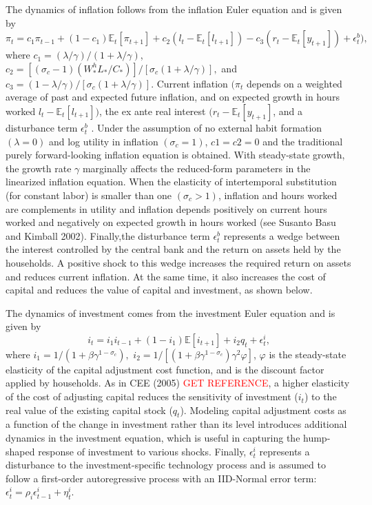 \documentclass[11pt]{article}
\newcommand{\E}{\mathbb{E}}
\newcommand{\cobs}[1]{\pi_{#1}}
\newcommand{\iobs}[1]{i_{#1}}
\newcommand{\lobs}[1]{l_{#1}}
\newcommand{\robs}[1]{r_{#1}}
\newcommand{\piobs}[1]{y_{#1}}
\newcommand{\consumption}{inflation}
\newcommand{\investment}{investment}
\newcommand{\hours}{hours worked}
\newcommand{\realinterest}{real interest}
\newcommand{\labor}{labor}
\newcommand{\interest}{interest}
\newcommand{\attn}[1]{\textcolor{red}{#1}}
\begin{document}
The dynamics of \consumption{} follows from the \consumption{} Euler
equation and is given by \begin{equation}
  \cobs{t} = c_1\cobs{t-1} + (1-c_1)\E_t[\cobs{t+1}] + c_2 (\lobs{t}
  -\E_t[\lobs{t+1}]) - c_3(\robs{t}-\E_t[\piobs{t+1}])+\epsilon_t^b),
\end{equation} where \(c_1 = (\lambda/\gamma)/(1+\lambda/\gamma)\),
\(c_2 = [(\sigma_c - 1)(W_*^h L_*/C_*)] / [\sigma_c(1+\lambda/\gamma)],\)
and \(c_3 = (1-\lambda/\gamma)/[\sigma_c(1+\lambda/\gamma)]\). Current
\consumption{} \((\cobs{t}\) depends on a weighted average of past and
expected future \consumption, and on expected growth in \hours{}
\(\lobs{t}  -\E_t[\lobs{t+1}])\), the ex ante \realinterest{}
\((\robs{t}-\E_t[\piobs{t+1}]\), and a disturbance term \(\epsilon^b_t\)
. Under the assumption of no external habit formation \((\lambda=0)\)
and log utility in \consumption{} \((\sigma_c =1)\), \(c1 = c2 = 0\) and
the traditional purely forward-looking \consumption{} equation is
obtained. With steady-state growth, the growth rate \(\gamma\)
marginally affects the reduced-form parameters in the linearized
\consumption{} equation. When the elasticity of intertemporal
substitution (for constant \labor) is smaller than one
\((\sigma_c > 1)\), \consumption{} and \hours{} are complements in
utility and \consumption{} depends positively on current \hours{} and
negatively on expected growth in \hours{} (see Susanto Basu and Kimball
2002). Finally,the disturbance term \(\epsilon_t^b\) represents a wedge
between the \interest{} controlled by the central bank and the return on
assets held by the households. A positive shock to this wedge increases
the required return on assets and reduces current \consumption. At the
same time, it also increases the cost of capital and reduces the value
of capital and \investment, as shown below.

The dynamics of \investment{} comes from the \investment{} Euler
equation and is given by \begin{equation}
  \iobs{t} = i_1\iobs{t-1} + (1-i_1)\E[\iobs{t+1}] + i_2 q_t + \epsilon_t^i,
\end{equation} where \(i_1 = 1/(1+\beta\gamma^{1-\sigma_c}),\)
\(i_2 = 1/[(1+\beta\gamma^{1-\sigma_c})\gamma^2\varphi]\), \(\varphi\)
is the steady-state elasticity of the capital adjustment cost function,
and is the discount factor applied by households. As in CEE (2005)
\attn{GET REFERENCE}, a higher elasticity of the cost of adjusting
capital reduces the sensitivity of \investment{} (\(\iobs{t}\)) to the
real value of the existing capital stock (\(q_t\)). Modeling capital
adjustment costs as a function of the change in \investment{} rather
than its level introduces additional dynamics in the \investment{}
equation, which is useful in capturing the hump-shaped response of
\investment{} to various shocks. Finally, \(\epsilon^i_t\) represents a
disturbance to the \investment-specific technology process and is
assumed to follow a first-order autoregressive process with an
IID-Normal error term:
\(\epsilon_t^i = \rho_i\epsilon_{t-1}^i + \eta_t^i\).
\end{document}

